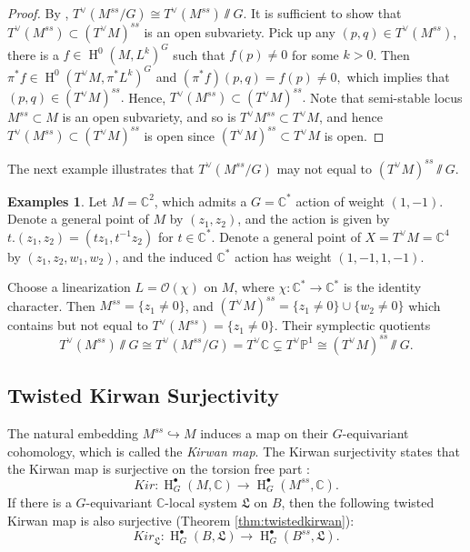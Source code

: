 \documentclass[12pt]{amsart}
\theoremstyle{definition}
\newtheorem{examples}[theorem]{Examples}
\theoremstyle{remark}
\numberwithin{equation}{section}
\newcommand{\CC}{\mathbb{C}}
\newcommand{\PP}{\mathbb{P}}
\newcommand{\shO}{\mathcal{O}}
\newcommand{\arw}{\longrightarrow}
\newcommand{\Hdot}{\operatorname{H}}
\begin{document}
\begin{proof}
    By \cite{anel2022shifted}, $T^{\vee}({M^{ss}/G})\cong T^{\vee}(M^{ss})\sslash  G$. It is sufficient to show that $T^{\vee}(M^{ss})\subset (T^{\vee}M)^{ss}$ is an open subvariety. Pick up any $(p, q)\in T^{\vee}(M^{ss})$, there is a $f\in \Hdot^0(M, L^k)^G$ such that $f(p)\neq 0$ for some $k> 0$. Then $\pi^*f\in \Hdot^0(T^{\vee}M, \pi^*L^k)^G$ and $(\pi^*f)(p, q)=f(p)\neq 0,$ which implies that $(p, q)\in (T^{\vee}M)^{ss}.$ Hence, $T^{\vee}(M^{ss})\subset (T^{\vee}M)^{ss}.$ Note that semi-stable locus $M^{ss}\subset M$ is an open subvariety, and so is $T^{\vee}M^{ss}\subset T^{\vee}M$, and hence $T^{\vee}(M^{ss})\subset (T^{\vee}M)^{ss}$ is open since $(T^{\vee}M)^{ss}\subset T^{\vee}M$ is open.
\end{proof}
The next example illustrates that $T^{\vee}({M^{ss}/G})$ may not equal to $ (T^{\vee}M)^{ss}\sslash  G$.
\begin{examples}
Let $M=\CC^2$, which admits a $G=\CC^{*}$ action of weight $(1,-1)$. Denote a general point of $M$ by $(z_1, z_2)$, and the action is given by $t.(z_1, z_2)=(tz_1, t^{-1}z_2)$ for $t\in \CC^*$. Denote a general point of $X=T^{\vee}M=\CC^4$ by $(z_1, z_2, w_1, w_2)$, and the induced $\CC^*$ action has weight $(1,-1,1,-1)$. 

Choose a linearization $L=\shO(\chi)$ on $M$, where $\chi: \CC^{*}\arw \CC^{*}$ is the identity character. Then $M^{ss}=\{z_1\neq 0\}$, and $(T^{\vee}M)^{ss}=\{z_1\neq 0\}\cup\{w_2\neq 0\}$ which contains but not equal to $T^{\vee}(M^{ss})=\{z_1\neq 0\}$. Their symplectic quotients
$$T^{\vee}(M^{ss})\sslash  G\cong T^{\vee}(M^{ss}/G)=T^{\vee}\CC \subsetneq T^{\vee}\PP^1\cong (T^{\vee}M)^{ss}\sslash  G.$$
\end{examples}

\subsection{Twisted Kirwan Surjectivity}
The natural embedding $M^{ss}\hookrightarrow M$ induces a map on their $G$-equivariant cohomology, which is called the \emph{Kirwan map}. The Kirwan surjectivity states that the Kirwan map is surjective on the torsion free part \cite{kirwan1984cohomology}:
$$ Kir: \Hdot^{\bullet}_G(M,
\CC)\longrightarrow \Hdot^{\bullet}_G(M^{ss}, \CC).$$ 
If there is a $G$-equivariant $\CC$-local system $\mathfrak{L}$ on $B$, then the following twisted Kirwan map is also surjective (Theorem \ref{thm:twistedkirwan}):
$$ Kir_{\mathfrak{L}}: \Hdot^{\bullet}_G(B,
\mathfrak{L})\longrightarrow \Hdot^{\bullet}_G(B^{ss}, \mathfrak{L}).$$ 
\end{document}
